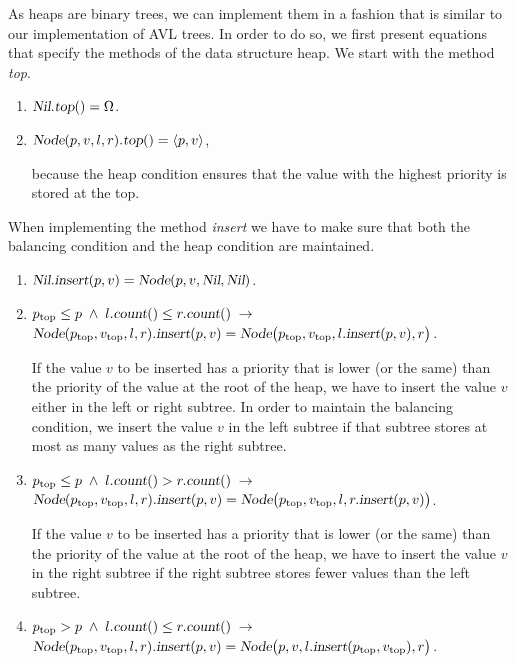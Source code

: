 As heaps are binary trees, we can implement them in a fashion that is similar to our implementation
of AVL trees.  In order to do so, we first present equations that specify the methods of the data
structure heap.  We start with the method \textsl{top}.  
\begin{enumerate}
\item $\textsl{Nil}.\textsl{top}() = \Omega$.
\item $\textsl{Node}(p,v,l,r).\textsl{top}() = \pair(p,v)$,

      because the heap condition ensures that the value with the highest priority is stored at the
      top. 
\end{enumerate}
When  implementing the method \textsl{insert} we have to make sure that both the balancing condition
and the heap condition are maintained.
\begin{enumerate}
\item $\textsl{Nil}.\textsl{insert}(p,v) = \textsl{Node}(p,v,\textsl{Nil}, \textsl{Nil})$.
\item $p_{\mathrm{top}} \leq p \;\wedge\; l.\textsl{count}() \leq r.\textsl{count}() \;\rightarrow $   \\[0.1cm]
      \hspace*{1.3cm} 
      $\textsl{Node}(p_{\mathrm{top}},v_\mathrm{top},l,r).\textsl{insert}(p,v) =
                 \textsl{Node}\bigl(p_\mathrm{top},v_\mathrm{top},l.\textsl{insert}(p,v), r\bigr)$.
                 
      If the value $v$ to be inserted has a priority that is lower (or the same) than the priority of
      the value at the root of the heap, we have to insert the value $v$ either in the left or right
      subtree.  In order to maintain the balancing condition, we insert the value $v$ in the left
      subtree if that subtree stores at most as many values as the right subtree.
\item $p_{\mathrm{top}} \leq p \;\wedge\; l.\textsl{count}() > r.\textsl{count}() \;\rightarrow $   \\[0.1cm]
      \hspace*{1.3cm} 
      $\textsl{Node}(p_{\mathrm{top}},v_\mathrm{top},l,r).\textsl{insert}(p,v) =
                 \textsl{Node}\bigl(p_\mathrm{top},v_\mathrm{top},l,r.\textsl{insert}(p,v)\bigr)$.

      If the value $v$ to be inserted has a priority that is lower (or the same) than the priority of
      the value at the root of the heap, we have to insert the value $v$ in the right
      subtree if the right subtree  stores fewer values than the left subtree.
\item $p_{\mathrm{top}} > p \;\wedge\; l.\textsl{count}() \leq r.\textsl{count}() \;\rightarrow $ \\[0.1cm]
      \hspace*{1.3cm} 
      $\textsl{Node}(p_{\mathrm{top}},v_\mathrm{top},l,r).\textsl{insert}(p,v) =
                 \textsl{Node}\bigl(p,v,l.\textsl{insert}(p_\mathrm{top},v_\mathrm{top}), r\bigr)$.


\end{enumerate}
